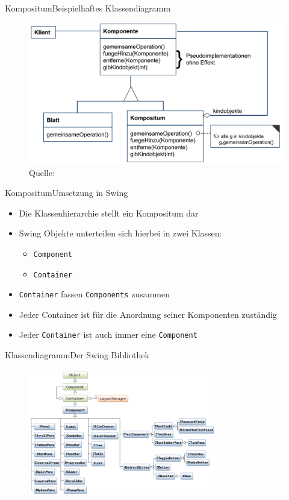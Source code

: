 \begin{frame}{Kompositum}{Beispielhaftes Klassendiagramm}
    \begin{figure}
	\includegraphics*[width=.8\textwidth]{graph/compositum_cd}
    \caption*{Quelle: \cite{judt2017}}
    \end{figure}
\end{frame}

\begin{frame}{Kompositum}{Umsetzung in Swing}
	\begin{itemize}
		\item Die Klassenhierarchie stellt ein Kompositum dar
		\item Swing Objekte unterteilen sich hierbei in zwei Klassen:
		\begin{itemize}
			\item \texttt{Component}
			\item \texttt{Container}
		\end{itemize}
		\item \texttt{Container} fassen \texttt{Components} zusammen
		\item Jeder Container ist für die Anordnung seiner Komponenten zuständig
		\item Jeder \texttt{Container} ist auch immer eine \texttt{Component}
	\end{itemize}
\end{frame}

\begin{frame}{Klassendiagramm}{Der Swing Bibliothek}
    \begin{figure}
	\includegraphics*[height=5.5cm]{graph/swing_cd}
    \end{figure}
\end{frame}

